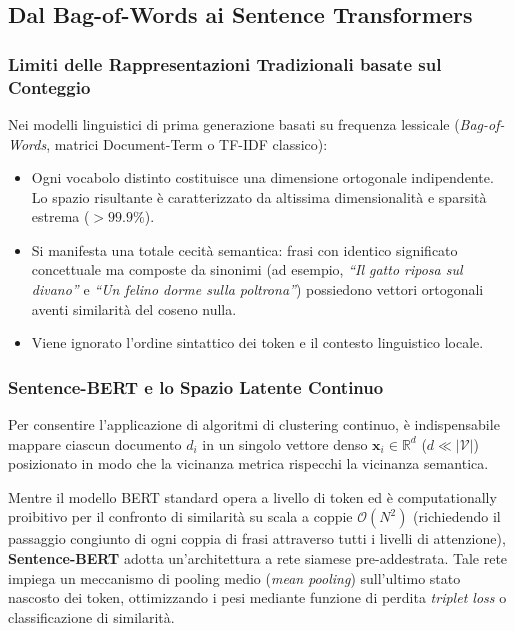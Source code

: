 \FloatBarrier
\subsection{Dal Bag-of-Words ai Sentence Transformers}
\label{sec:lab-text-embeddings}

\FloatBarrier
\subsubsection{Limiti delle Rappresentazioni Tradizionali basate sul Conteggio}
\label{subsec:lab-bow-limits}

Nei modelli linguistici di prima generazione basati su frequenza lessicale (\textit{Bag-of-Words}, matrici Document-Term o TF-IDF classico):
\begin{itemize}
    \item Ogni vocabolo distinto costituisce una dimensione ortogonale indipendente. Lo spazio risultante è caratterizzato da altissima dimensionalità e sparsità estrema ($> 99.9\%$).
    \item Si manifesta una totale cecità semantica: frasi con identico significato concettuale ma composte da sinonimi (ad esempio, \textit{``Il gatto riposa sul divano''} e \textit{``Un felino dorme sulla poltrona''}) possiedono vettori ortogonali aventi similarità del coseno nulla.
    \item Viene ignorato l'ordine sintattico dei token e il contesto linguistico locale.
\end{itemize}

\FloatBarrier
\subsubsection{Sentence-BERT e lo Spazio Latente Continuo}
\label{subsec:lab-sbert}

Per consentire l'applicazione di algoritmi di clustering continuo, è indispensabile mappare ciascun documento $d_i$ in un singolo vettore denso $\mathbf{x}_i \in \mathbb{R}^d$ ($d \ll |\mathcal{V}|$) posizionato in modo che la vicinanza metrica rispecchi la vicinanza semantica. 

Mentre il modello BERT standard opera a livello di token ed è computationally proibitivo per il confronto di similarità su scala a coppie $\mathcal{O}(N^2)$ (richiedendo il passaggio congiunto di ogni coppia di frasi attraverso tutti i livelli di attenzione), \textbf{Sentence-BERT} \cite{reimers2019} adotta un'architettura a rete siamese pre-addestrata. Tale rete impiega un meccanismo di pooling medio (\textit{mean pooling}) sull'ultimo stato nascosto dei token, ottimizzando i pesi mediante funzione di perdita \textit{triplet loss} o classificazione di similarità.

